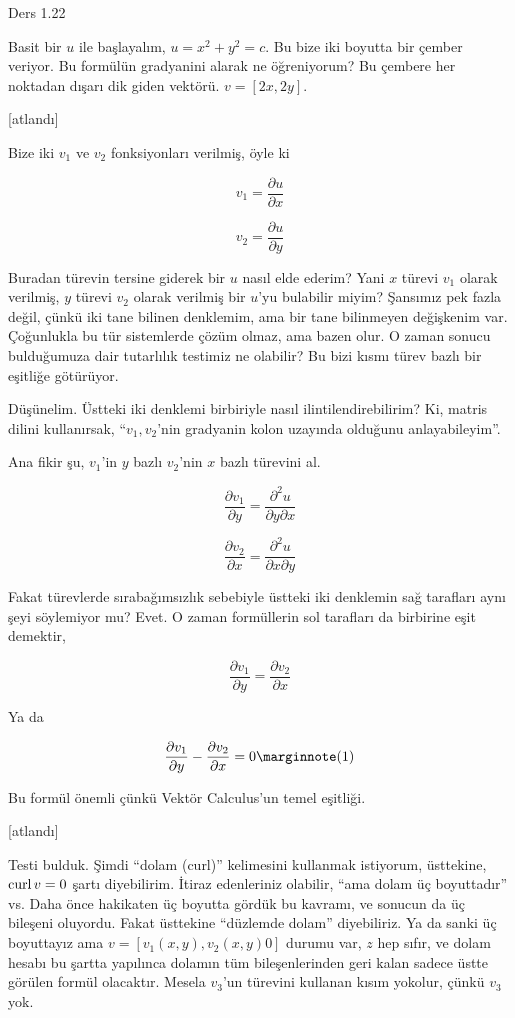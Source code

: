 \documentclass[12pt,fleqn]{article}\usepackage{../../common}
\begin{document}
Ders 1.22

Basit bir $u$ ile başlayalım, $u = x^2 + y^2 = c$. Bu bize iki boyutta bir
çember veriyor. Bu formülün gradyanini alarak ne öğreniyorum? Bu çembere her
noktadan dışarı dik giden vektörü. $v = [2x, 2y]$.

[atlandı]

Bize iki $v_1$ ve $v_2$ fonksiyonları verilmiş, öyle ki

$$
v_1 = \frac{\partial u}{\partial x}
$$

$$
v_2 = \frac{\partial u}{\partial y}
$$

Buradan türevin tersine giderek bir $u$ nasıl elde ederim? Yani $x$ türevi $v_1$
olarak verilmiş, $y$ türevi $v_2$ olarak verilmiş bir $u$'yu bulabilir miyim?
Şansımız pek fazla değil, çünkü iki tane bilinen denklemim, ama bir tane
bilinmeyen değişkenim var. Çoğunlukla bu tür sistemlerde çözüm olmaz, ama bazen
olur. O zaman sonucu bulduğumuza dair tutarlılık testimiz ne olabilir?
Bu bizi kısmı türev bazlı bir eşitliğe götürüyor.

Düşünelim. Üstteki iki denklemi birbiriyle nasıl ilintilendirebilirim? Ki,
matris dilini kullanırsak, ``$v_1,v_2$'nin gradyanin kolon uzayında olduğunu
anlayabileyim''. 

Ana fikir şu, $v_1$'in $y$ bazlı $v_2$'nin $x$ bazlı türevini al.

$$
\frac{\partial v_1}{\partial y} = \frac{\partial^2 u}{\partial y \partial x}
$$

$$
\frac{\partial v_2}{\partial x} = \frac{\partial^2 u}{\partial x \partial y}
$$

Fakat türevlerde sırabağımsızlık sebebiyle üstteki iki denklemin sağ tarafları
aynı şeyi söylemiyor mu? Evet. O zaman formüllerin sol tarafları da birbirine
eşit demektir,

$$
\frac{\partial v_1}{\partial y} = \frac{\partial v_2}{\partial x} 
$$

Ya da

$$
\frac{\partial v_1}{\partial y} - \frac{\partial v_2}{\partial x} = 0
\mlabel{1}
$$

Bu formül önemli çünkü Vektör Calculus'un temel eşitliği.

[atlandı]

Testi bulduk. Şimdi ``dolam (curl)'' kelimesini kullanmak istiyorum, üsttekine,
$\operatorname{curl} v = 0$ şartı diyebilirim. İtiraz edenleriniz olabilir, ``ama dolam üç
boyuttadır'' vs. Daha önce hakikaten üç boyutta gördük bu kavramı, ve sonucun da
üç bileşeni oluyordu. Fakat üsttekine ``düzlemde dolam'' diyebiliriz.  Ya da
sanki üç boyuttayız ama $v = [v_1(x,y), v_2(x,y) 0]$ durumu var, $z$ hep sıfır,
ve dolam hesabı bu şartta yapılınca dolamın tüm bileşenlerinden geri kalan
sadece üstte görülen formül olacaktır. Mesela $v_3$'un türevini kullanan kısım
yokolur, çünkü $v_3$ yok.
\end{document}
